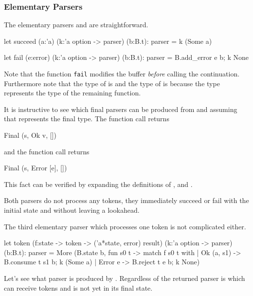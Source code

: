 \subsubsection{Elementary Parsers}
The elementary parsers  and  are
straightforward.
\begin{ocaml}
  let succeed (a:'a) (k:'a option -> parser) (b:B.t): parser =
    k (Some a)

  let fail (e:error) (k:'a option -> parser) (b:B.t): parser =
    B.add_error e b;
    k None
\end{ocaml}
%
Note that the function \verb!fail! modifies the buffer \emph{before} calling
the continuation. Furthermore note that the type of  is  and the type of  is  because the
type  represents the type of the remaining function.

It is instructive to see which final parsers can be produced from
 and  assuming that  represents the final
type. The function call  returns
%
\begin{ocaml}
  Final (s, Ok v, [])
\end{ocaml}
%
and the function call  returns
%
\begin{ocaml}
  Final (s, Error [e], [])
\end{ocaml}
%
This fact can be verified by expanding the definitions of ,
 and .

Both parsers do not process any tokens, they immediately succeed or fail with
the initial state and without leaving a lookahead.

The third elementary parser which processes one token is not complicated
either.
\begin{ocaml}
  let token (f:state -> token -> ('a*state, error) result)
            (k:'a option -> parser)
            (b:B.t): parser =
    More (B.state b,
          fun s0 t ->
            match f s0 t with
            | Ok (a, s1) ->
                B.consume t s1 b;
                k (Some a)
            | Error e ->
                B.reject t e b;
                k None)
\end{ocaml}

Let's see what parser is produced by . Regardless of  the returned parser is  which
can receive tokens and is not yet in its final state.


